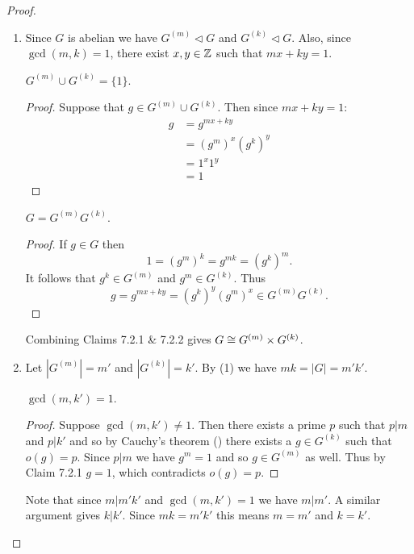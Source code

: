 \documentclass[11pt]{article}
\begin{document}
\begin{proof}\,
    \begin{enumerate}
        \item Since $G$ is abelian we have $G^{(m)}\lhd G$ and $G^{(k)}\lhd G$. Also, since $\gcd(m,k)=1$, there exist $x,y\in\mathbb{Z}$ such that $mx+ky=1$.
        \begin{claim}
            $G^{(m)}\cup G^{(k)}=\{1\}$.
        \end{claim}
        \begin{proof}
            Suppose that $g\in G^{(m)}\cup G^{(k)}$. Then since $mx+ky=1$:
            \begin{align*}
                g&=g^{mx+ky} \\
                &=(g^m)^x(g^k)^y \\
                &=1^x1^y \\
                &=1
            \end{align*}
        \end{proof}
        \begin{claim}
            $G=G^{(m)}G^{(k)}$.
        \end{claim}
        \begin{proof}
            If $g\in G$ then
            \[1=(g^m)^k=g^{mk}=(g^k)^m.\]
            It follows that $g^k\in G^{(m)}$ and $g^m\in G^{(k)}$. Thus
            \[g=g^{mx+ky}=(g^k)^y(g^m)^x\in G^{(m)}G^{(k)}.\]
        \end{proof}
        Combining Claims 7.2.1 \& 7.2.2 gives $G\cong G^{(m)}\times G^{(k)}$.

        \item Let $|G^{(m)}|=m'$ and $|G^{(k)}|=k'$. By (1) we have $mk=|G|=m'k'$.
        \begin{claim}
            $\gcd(m,k')=1$.
        \end{claim}
        \begin{proof}
            Suppose $\gcd(m,k')\neq1$. Then there exists a prime $p$ such that $p|m$ and $p|k'$ and so by Cauchy's theorem () there exists a $g\in G^{(k)}$ such that $o(g)=p$. Since $p|m$ we have $g^m=1$ and so $g\in G^{(m)}$ as well. Thus by Claim 7.2.1 $g=1$, which contradicts $o(g)=p$.
        \end{proof}

        Note that since $m|m'k'$ and $\gcd(m,k')=1$ we have $m|m'$. A similar argument gives $k|k'$. Since $mk=m'k'$ this means $m=m'$ and $k=k'$.
    \end{enumerate}
\end{proof}
\end{document}
